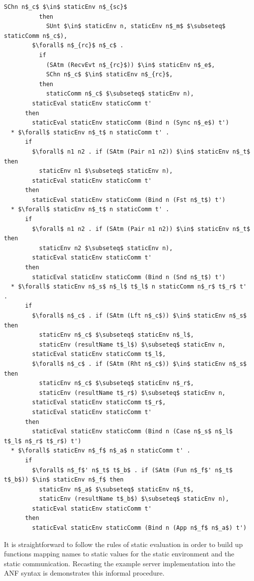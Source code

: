 \documentclass[letterpaper, 11pt]{extarticle}
\begin{document}
\begin{lstlisting}[language=logic, mathescape]
            SChn n$_c$ $\in$ staticEnv n$_{sc}$ 
          then
            SUnt $\in$ staticEnv n, staticEnv n$_m$ $\subseteq$ staticComm n$_c$),
        $\forall$ n$_{rc}$ n$_c$ . 
          if
            (SAtm (RecvEvt n$_{rc}$)) $\in$ staticEnv n$_e$,
            SChn n$_c$ $\in$ staticEnv n$_{rc}$, 
          then
            staticComm n$_c$ $\subseteq$ staticEnv n),
        staticEval staticEnv staticComm t'
      then
        staticEval staticEnv staticComm (Bind n (Sync n$_e$) t')
  * $\forall$ staticEnv n$_t$ n staticComm t' . 
      if
        $\forall$ n1 n2 . if (SAtm (Pair n1 n2)) $\in$ staticEnv n$_t$ then
          staticEnv n1 $\subseteq$ staticEnv n),
        staticEval staticEnv staticComm t'
      then
        staticEval staticEnv staticComm (Bind n (Fst n$_t$) t')
  * $\forall$ staticEnv n$_t$ n staticComm t' . 
      if
        $\forall$ n1 n2 . if (SAtm (Pair n1 n2)) $\in$ staticEnv n$_t$ then
          staticEnv n2 $\subseteq$ staticEnv n),
        staticEval staticEnv staticComm t'
      then
        staticEval staticEnv staticComm (Bind n (Snd n$_t$) t')
  * $\forall$ staticEnv n$_s$ n$_l$ t$_l$ n staticComm n$_r$ t$_r$ t' . 
      if
        $\forall$ n$_c$ . if (SAtm (Lft n$_c$)) $\in$ staticEnv n$_s$ then 
          staticEnv n$_c$ $\subseteq$ staticEnv n$_l$,
          staticEnv (resultName t$_l$) $\subseteq$ staticEnv n,
        staticEval staticEnv staticComm t$_l$,
        $\forall$ n$_c$ . if (SAtm (Rht n$_c$)) $\in$ staticEnv n$_s$ then 
          staticEnv n$_c$ $\subseteq$ staticEnv n$_r$, 
          staticEnv (resultName t$_r$) $\subseteq$ staticEnv n, 
        staticEval staticEnv staticComm t$_r$,
        staticEval staticEnv staticComm t'
      then
        staticEval staticEnv staticComm (Bind n (Case n$_s$ n$_l$ t$_l$ n$_r$ t$_r$) t')
  * $\forall$ staticEnv n$_f$ n$_a$ n staticComm t' . 
      if
        $\forall$ n$_f$' n$_t$ t$_b$ . if (SAtm (Fun n$_f$' n$_t$ t$_b$)) $\in$ staticEnv n$_f$ then 
          staticEnv n$_a$ $\subseteq$ staticEnv n$_t$, 
          staticEnv (resultName t$_b$) $\subseteq$ staticEnv n),
        staticEval staticEnv staticComm t'
      then
        staticEval staticEnv staticComm (Bind n (App n$_f$ n$_a$) t')
\end{lstlisting}

It is straightforward to follow the rules of static evaluation in order to build up
functions mapping names to static values for the static environment
and the static communication.
Recasting the example server implementation into the
ANF syntax is demonstrates this
informal procedure.
\end{document}
